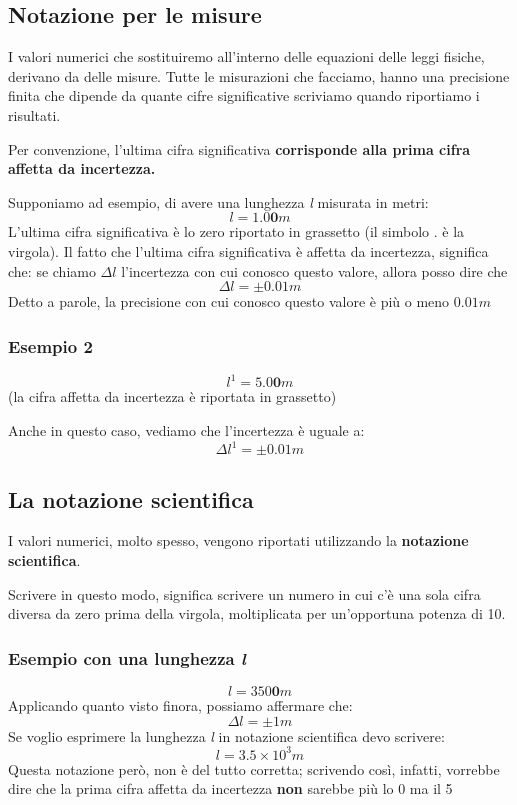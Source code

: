 \documentclass[a4paper]{book}
\begin{document}
\subsection{Notazione per le misure}
I valori numerici che sostituiremo all'interno delle equazioni delle leggi fisiche, derivano da delle misure.  Tutte le misurazioni che facciamo,  hanno una precisione finita che dipende da quante cifre significative scriviamo quando riportiamo i risultati.

Per convenzione, l'ultima cifra significativa \textbf{corrisponde alla prima cifra affetta da incertezza.}

Supponiamo ad esempio, di avere una lunghezza  \textit{l} misurata in metri:
$$ l = 1.0\textbf{0} m $$ 
L'ultima cifra significativa è lo zero riportato in grassetto (il simbolo .  è la virgola). 
Il fatto che l'ultima cifra significativa è affetta da incertezza, significa che:
se chiamo $\Delta l$ l'incertezza con cui conosco questo valore, allora posso dire che 
$$\Delta l =  \pm 0.01m$$
Detto a parole, la precisione con cui conosco questo valore è più o meno $0.01m$

\subsubsection{Esempio 2}
$$ l^{1} = 5.0\textbf{0} m $$
 (la cifra affetta da incertezza è riportata in grassetto)
 
 Anche in questo caso, vediamo che l'incertezza è uguale a:
 $$ \Delta l^{1} = \pm 0.01m $$
 
 \subsection{La notazione scientifica}
 I valori numerici,  molto spesso, vengono riportati utilizzando la \textbf{notazione scientifica}. 
 
 Scrivere in questo modo, significa scrivere un numero in cui c'è una sola cifra diversa da zero prima della virgola, moltiplicata per un'opportuna potenza di 10.
 
 \subsubsection{Esempio con una lunghezza \textit{l}} 
 $$ l = 350\textbf{0}m$$
 Applicando quanto visto finora, possiamo affermare che:
 $$\Delta l = \pm 1m$$
 Se voglio esprimere la lunghezza \textit{l} in notazione scientifica devo scrivere:
 $$ l = 3.5 \times 10^{3}m$$
 Questa notazione però, non è del tutto corretta; scrivendo così,  infatti, vorrebbe dire che la prima cifra affetta da incertezza \textbf{non} sarebbe più lo 0 ma il 5
 
\end{document}
